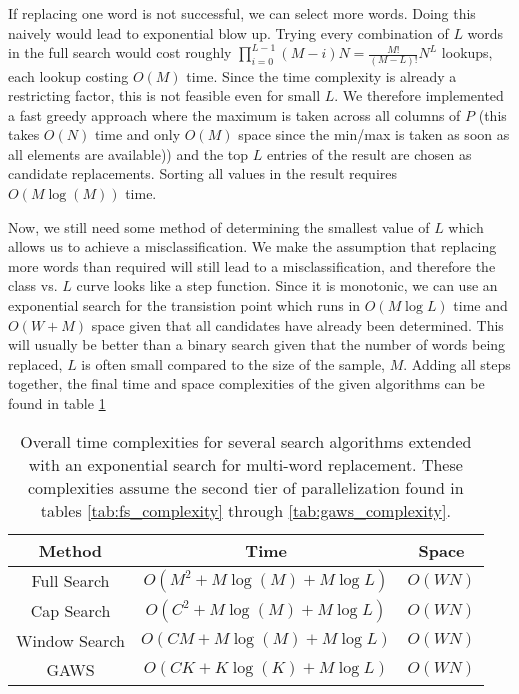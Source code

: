 If replacing one word is not successful, we can select more words.  Doing this naively would lead to exponential blow up.  Trying every combination of $L$ words in the full search would cost roughly $\prod_{i=0}^{L-1} (M-i)N = \frac{M!}{(M-L)!}N^L$ lookups, each lookup costing $O(M)$ time.  Since the time complexity is already a restricting factor, this is not feasible even for small $L$.  We therefore implemented a fast greedy approach where the maximum is taken across all columns of $P$ (this takes $O(N)$ time and only $O(M)$ space since the min/max is taken as soon as all elements are available)) and the top $L$ entries of the result are chosen as candidate replacements.  Sorting all values in the result requires $O(M\log(M))$ time.

Now, we still need some method of determining the smallest value of $L$ which allows us to achieve a misclassification.  We make the assumption that replacing more words than required will still lead to a misclassification, and therefore the class vs. $L$ curve looks like a step function.  Since it is monotonic, we can use an exponential search for the transistion point which runs in $O(M\log L)$ time and $O(W+M)$ space given that all candidates have already been determined.  This will usually be better than a binary search given that the number of words being replaced, $L$ is often small compared to the size of the sample, $M$.  Adding all steps together, the final time and space complexities of the given algorithms can be found in table \ref{tab:overall_complexity}
\begin{table}
\centering
\begin{tabular}{ |c|c|c| } 
 \hline
 Method & Time & Space \\ \hline
 Full Search & $O(M^2 + M\log(M) + M\log L)$ & $O(WN)$ \\ \hline 
 Cap Search & $O(C^2 + M\log(M) + M\log L)$ & $O(WN)$ \\ \hline 
 Window Search & $O(CM + M\log(M) + M\log L)$ & $O(WN)$ \\ \hline 
 GAWS & $O(CK + K\log(K) + M\log L)$ & $O(WN)$ \\ \hline 
\end{tabular}
\caption{Overall time complexities for several search algorithms extended with an exponential search for multi-word replacement.  These complexities assume the second tier of parallelization found in tables \ref{tab:fs_complexity} through \ref{tab:gaws_complexity}.}
\label{tab:overall_complexity}
\end{table}
